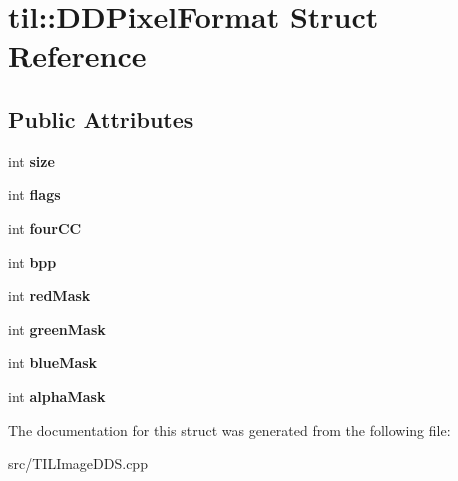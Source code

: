 \hypertarget{structtil_1_1_d_d_pixel_format}{
\section{til::DDPixelFormat Struct Reference}
\label{structtil_1_1_d_d_pixel_format}
}
\subsection*{Public Attributes}
\begin{DoxyCompactItemize}
\item 
\hypertarget{structtil_1_1_d_d_pixel_format_a3bd02cd55e24bb8ad55e14c9077f785f}{
int {\bfseries size}}
\label{structtil_1_1_d_d_pixel_format_a3bd02cd55e24bb8ad55e14c9077f785f}

\item 
\hypertarget{structtil_1_1_d_d_pixel_format_a90e1029dcb432fd1e98dac37f72ec36b}{
int {\bfseries flags}}
\label{structtil_1_1_d_d_pixel_format_a90e1029dcb432fd1e98dac37f72ec36b}

\item 
\hypertarget{structtil_1_1_d_d_pixel_format_a222fc7c23eeef6edfc7065ddf998dd78}{
int {\bfseries fourCC}}
\label{structtil_1_1_d_d_pixel_format_a222fc7c23eeef6edfc7065ddf998dd78}

\item 
\hypertarget{structtil_1_1_d_d_pixel_format_a1f8bdc9a97e30dae05d4d8d61555a3c0}{
int {\bfseries bpp}}
\label{structtil_1_1_d_d_pixel_format_a1f8bdc9a97e30dae05d4d8d61555a3c0}

\item 
\hypertarget{structtil_1_1_d_d_pixel_format_aedcc41e37c45732fc225697765ad5252}{
int {\bfseries redMask}}
\label{structtil_1_1_d_d_pixel_format_aedcc41e37c45732fc225697765ad5252}

\item 
\hypertarget{structtil_1_1_d_d_pixel_format_ab28216882367f3d25ce236c0397c50a7}{
int {\bfseries greenMask}}
\label{structtil_1_1_d_d_pixel_format_ab28216882367f3d25ce236c0397c50a7}

\item 
\hypertarget{structtil_1_1_d_d_pixel_format_a541e65eff31b22febdcfd520a2b2ce1e}{
int {\bfseries blueMask}}
\label{structtil_1_1_d_d_pixel_format_a541e65eff31b22febdcfd520a2b2ce1e}

\item 
\hypertarget{structtil_1_1_d_d_pixel_format_ae44e3b3a0318d2655910afdfc0e1b9a4}{
int {\bfseries alphaMask}}
\label{structtil_1_1_d_d_pixel_format_ae44e3b3a0318d2655910afdfc0e1b9a4}

\end{DoxyCompactItemize}


The documentation for this struct was generated from the following file:\begin{DoxyCompactItemize}
\item 
src/TILImageDDS.cpp\end{DoxyCompactItemize}
